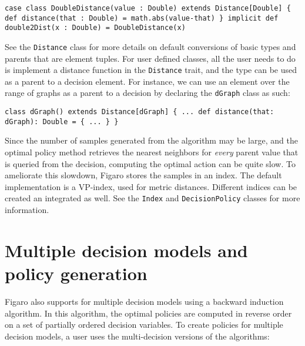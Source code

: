 \begin{flushleft}
\texttt{case class DoubleDistance(value : Double) extends Distance[Double] \{
\newline \tab def distance(that : Double) = math.abs(value-that)
\newline \}
\newline implicit def double2Dist(x : Double) = DoubleDistance(x)
}
\end{flushleft}

See the \texttt{Distance} class for more details on default conversions of basic types and parents that are element tuples. For user defined classes, all the user needs to do is implement a distance function in the \texttt{Distance} trait, and the type can be used as a parent to a decision element. For instance, we can use an element over the range of graphs as a parent to a decision by declaring the \texttt{dGraph} class as such:

\begin{flushleft}
\texttt{class dGraph() extends Distance[dGraph] \{
\newline \tab ...
\newline \tab def distance(that: dGraph): Double = \{
\newline \tab \tab ...
\newline \}
\newline \} }
\end{flushleft}

Since the number of samples generated from the algorithm may be large, and the optimal policy method retrieves the nearest neighbors for \emph{every} parent value that is queried from the decision, computing the optimal action can be quite slow. To ameliorate this slowdown, Figaro stores the samples in an index. The default implementation is a VP-index, used for metric distances. Different indices can be created an integrated as well. See the \texttt{Index} and \texttt{DecisionPolicy} classes for more information.

\section{Multiple decision models and policy generation}

Figaro also supports for multiple decision models using a backward induction algorithm. 
In this algorithm, the optimal policies are computed in reverse order on a set of partially ordered decision variables. To create policies for multiple decision models, a user uses the multi-decision versions of the algorithms:


